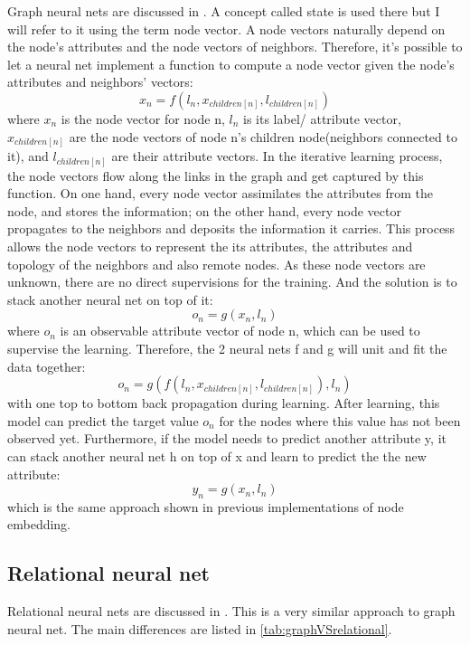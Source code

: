 \documentclass{article}
\begin{document}
Graph neural nets are discussed in \cite{scarselli2009graph}. A concept called state is used there but I will refer to it using the term node vector. A node vectors naturally depend on the node's attributes and the node vectors of neighbors. Therefore, it's possible to let a neural net implement a function to compute a node vector given the node's attributes and neighbors' vectors:
\begin{equation}
	x_n = f(l_n, x_{children[n]}, l_{children[n]})
\end{equation}
where $ x_n $ is the node vector for node n, $ l_n $ is its label/ attribute vector, $ x_{children[n]} $ are the node vectors of node n's children node(neighbors connected to it), and $ l_{children[n]} $ are their attribute vectors. In the iterative learning process, the node vectors flow along the links in the graph and get captured by this function. On one hand, every node vector assimilates the attributes from the node, and stores the information; on the other hand, every node vector propagates to the neighbors and deposits the information it carries. This process allows the node vectors to represent the its attributes, the attributes and topology of the neighbors and also remote nodes. As these node vectors are unknown, there are no direct supervisions for the training. And the solution is to stack another neural net on top of it:
\begin{equation}
	o_n = g(x_n, l_n)
\end{equation}
where $ o_n $ is an observable attribute vector of node n, which can be used to supervise the learning. Therefore, the 2 neural nets f and g will unit and fit the data together:
\begin{equation}
	o_n = g(f(l_n, x_{children[n]}, l_{children[n]}), l_n)
\end{equation}
with one top to bottom back propagation during learning. After learning, this model can predict the target value $ o_n $ for the nodes where this value has not been observed yet. Furthermore, if the model needs to predict another attribute y, it can stack another neural net h on top of x and learn to predict the the new attribute:
\begin{equation}
	y_n = g(x_n, l_n)
\end{equation}
which is the same approach shown in previous implementations of node embedding.

\subsection{Relational neural net}
Relational neural nets are discussed in \cite{uwents2011neural}. This is a very similar approach to graph neural net. The main differences are listed in \autoref{tab:graphVSrelational}.
\end{document}
